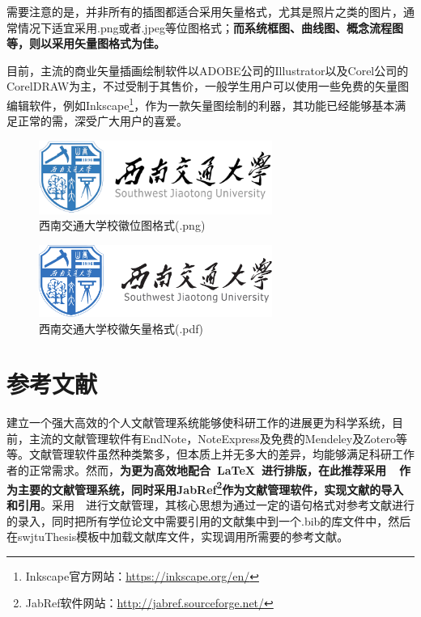 \par
需要注意的是，并非所有的插图都适合采用矢量格式，尤其是照片之类的图片，通常情况下适宜采用.png或者.jpeg等位图格式；\textbf{而系统框图、曲线图、概念流程图等，则以采用矢量图格式为佳。}

\par
目前，主流的商业矢量插画绘制软件以ADOBE公司的Illustrator以及Corel公司的CorelDRAW为主，不过受制于其售价，一般学生用户可以使用一些免费的矢量图编辑软件，例如Inkscape\footnote{Inkscape官方网站：\url{https://inkscape.org/en/}}，作为一款矢量图绘制的利器，其功能已经能够基本满足正常的需，深受广大用户的喜爱。

\begin{figure}[htbp]
	\centering
	\includegraphics[width=3in]{figures/SWJTU_LOGO.png}
	\caption{西南交通大学校徽位图格式(.png)}
	\label{SWJTU_LOGO_PNG}
\end{figure}

\begin{figure}[htbp]
	\centering
	\includegraphics[width=3in]{figures/SWJTU_LOGO.pdf}
	\caption{西南交通大学校徽矢量格式(.pdf)}
	\label{SWJTU_LOGO_PDF}
\end{figure}



\section{参考文献}
建立一个强大高效的个人文献管理系统能够使科研工作的进展更为科学系统，目前，主流的文献管理软件有EndNote，NoteExpress及免费的Mendeley及Zotero等等。文献管理软件虽然种类繁多，但本质上并无多大的差异，均能够满足科研工作者的正常需求。然而，\textbf{为更为高效地配合~\LaTeX{}~进行排版，在此推荐采用~\BibTeX{}~作为主要的文献管理系统，同时采用JabRef\footnote{JabRef软件网站：\url{http://jabref.sourceforge.net/}}作为文献管理软件，实现文献的导入和引用}。采用~\BibTeX{}~进行文献管理，其核心思想为通过一定的语句格式对参考文献进行的录入，同时把所有学位论文中需要引用的文献集中到一个.bib的库文件中，然后在swjtuThesis模板中加载文献库文件，实现调用所需要的参考文献。

